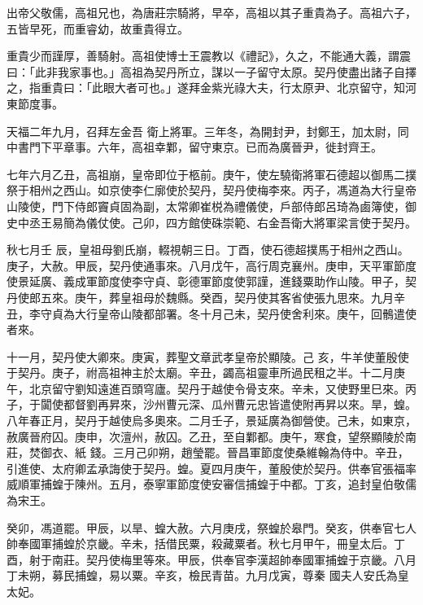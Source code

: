 
\begin{pinyinscope}

 出帝父敬儒，高祖兄也，為唐莊宗騎將，早卒，高祖以其子重貴為子。高祖六子，五皆早死，而重睿幼，故重貴得立。



 重貴少而謹厚，善騎射。高祖使博士王震教以《禮記》，久之，不能通大義，謂震曰：「此非我家事也。」高祖為契丹所立，謀以一子留守太原。契丹使盡出諸子自擇之，指重貴曰：「此眼大者可也。」遂拜金紫光祿大夫，行太原尹、北京留守，知河東節度事。



 天福二年九月，召拜左金吾
 衛上將軍。三年冬，為開封尹，封鄭王，加太尉，同中書門下平章事。六年，高祖幸鄴，留守東京。已而為廣晉尹，徙封齊王。



 七年六月乙丑，高祖崩，皇帝即位于柩前。庚午，使左驍衛將軍石德超以御馬二撲祭于相州之西山。如京使李仁廓使於契丹，契丹使梅李來。丙子，馮道為大行皇帝山陵使，門下侍郎竇貞固為副，太常卿崔棁為禮儀使，戶部侍郎呂琦為鹵簿使，御史中丞王易簡為儀仗使。己卯，四方館使硃崇範、右金吾衛大將軍梁言使于契丹。



 秋七月壬
 辰，皇祖母劉氏崩，輟視朝三日。丁酉，使石德超撲馬于相州之西山。庚子，大赦。甲辰，契丹使通事來。八月戊午，高行周克襄州。庚申，天平軍節度使景延廣、義成軍節度使李守貞、彰德軍節度使郭謹，進錢粟助作山陵。甲子，契丹使郎五來。庚午，葬皇祖母於魏縣。癸酉，契丹使其客省使張九思來。九月辛丑，李守貞為大行皇帝山陵都部署。冬十月己未，契丹使舍利來。庚午，回鶻遣使者來。



 十一月，契丹使大卿來。庚寅，葬聖文章武孝皇帝於顯陵。己
 亥，牛羊使董殷使于契丹。庚子，祔高祖神主於太廟。辛丑，蠲高祖靈車所過民租之半。十二月庚午，北京留守劉知遠進百頭穹廬。契丹于越使令骨支來。辛未，又使野里巳來。丙子，于闐使都督劉再昇來，沙州曹元深、瓜州曹元忠皆遣使附再昇以來。旱，蝗。八年春正月，契丹于越使烏多奧來。二月壬子，景延廣為御營使。己未，如東京，赦廣晉府囚。庚申，次澶州，赦囚。乙丑，至自鄴都。庚午，寒食，望祭顯陵於南莊，焚御衣、紙
 錢。三月己卯朔，趙瑩罷。晉昌軍節度使桑維翰為侍中。辛丑，引進使、太府卿孟承誨使于契丹。蝗。夏四月庚午，董殷使於契丹。供奉官張福率威順軍捕蝗于陳州。五月，泰寧軍節度使安審信捕蝗于中都。丁亥，追封皇伯敬儒為宋王。



 癸卯，馮道罷。甲辰，以旱、蝗大赦。六月庚戌，祭蝗於皋門。癸亥，供奉官七人帥奉國軍捕蝗於京畿。辛未，括借民粟，殺藏粟者。秋七月甲午，冊皇太后。丁酉，射于南莊。契丹使梅里等來。甲辰，供奉官李漢超帥奉國軍捕蝗于京畿。八月丁未朔，募民捕蝗，易以粟。辛亥，檢民青苗。九月戊寅，尊秦
 國夫人安氏為皇太妃。




\end{pinyinscope}
